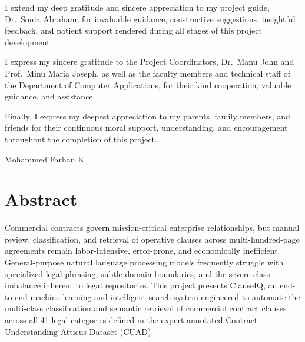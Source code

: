 \vspace{0.4cm}
\noindent I extend my deep gratitude and sincere appreciation to my project guide, Dr.~Sonia Abraham, for invaluable guidance, constructive suggestions, insightful feedback, and patient support rendered during all stages of this project development.

\vspace{0.4cm}
\noindent I express my sincere gratitude to the Project Coordinators, Dr.~Manu John and Prof.~Minu Maria Joseph, as well as the faculty members and technical staff of the Department of Computer Applications, for their kind cooperation, valuable guidance, and assistance.

\vspace{0.4cm}
\noindent Finally, I express my deepest appreciation to my parents, family members, and friends for their continuous moral support, understanding, and encouragement throughout the completion of this project.

\vspace{2.2cm}
\begin{flushright}
    Mohammed Farhan K
\end{flushright}

\newpage
{}
{}
\chapter*{Abstract}

Commercial contracts govern mission-critical enterprise relationships, but manual review, classification, and retrieval of operative clauses across multi-hundred-page agreements remain labor-intensive, error-prone, and economically inefficient. General-purpose natural language processing models frequently struggle with specialized legal phrasing, subtle domain boundaries, and the severe class imbalance inherent to legal repositories. This project presents ClauseIQ, an end-to-end machine learning and intelligent search system engineered to automate the multi-class classification and semantic retrieval of commercial contract clauses across all 41 legal categories defined in the expert-annotated Contract Understanding Atticus Dataset (CUAD).

